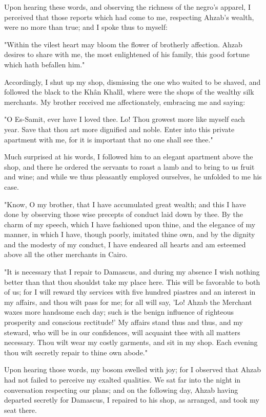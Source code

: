 Upon hearing these words, and observing the richness of the negro's
apparel, I perceived that those reports which had come to me,
respecting Ahzab's wealth, were no more than true; and I spoke thus to
myself:

"Within the vilest heart may bloom the flower of brotherly affection.
Ahzab desires to share with me, the most enlightened of his family,
this good fortune which hath befallen him."

Accordingly, I shut up my shop, dismissing the one who waited to be
shaved, and followed the black to the Khân Khalîl, where were the
shops of the wealthy silk merchants. My brother received me
affectionately, embracing me and saying:

"O Es-Samit, ever have I loved thee. Lo! Thou growest more like myself
each year. Save that thou art more dignified and noble. Enter into
this private apartment with me, for it is important that no one shall
see thee."

Much surprised at his words, I followed him to an elegant apartment
above the shop, and there he ordered the servants to roast a lamb and
to bring to us fruit and wine; and while we thus pleasantly employed
ourselves, he unfolded to me his case.

"Know, O my brother, that I have accumulated great wealth; and this
I have done by observing those wise precepts of conduct laid down by
thee. By the charm of my speech, which I have fashioned upon thine,
and the elegance of my manner, in which I have, though poorly,
imitated thine own, and by the dignity and the modesty of my conduct,
I have endeared all hearts and am esteemed above all the other
merchants in Cairo.

"It is necessary that I repair to Damascus, and during my absence I
wish nothing better than that thou shouldst take my place here. This
will be favorable to both of us; for I will reward thy services with
five hundred piastres and an interest in my affairs, and thou wilt
pass for me; for all will say, 'Lo! Ahzab the Merchant waxes more
handsome each day; such is the benign influence of righteous
prosperity and conscious rectitude!' My affairs stand thus and thus,
and my steward, who will be in our confidences, will acquaint thee
with all matters necessary. Thou wilt wear my costly garments, and sit
in my shop. Each evening thou wilt secretly repair to thine own
abode."

Upon hearing those words, my bosom swelled with joy; for I observed
that Ahzab had not failed to perceive my exalted qualities. We sat
far into the night in conversation respecting our plans; and on the
following day, Ahzab having departed secretly for Damascus, I repaired
to his shop, as arranged, and took my seat there.

